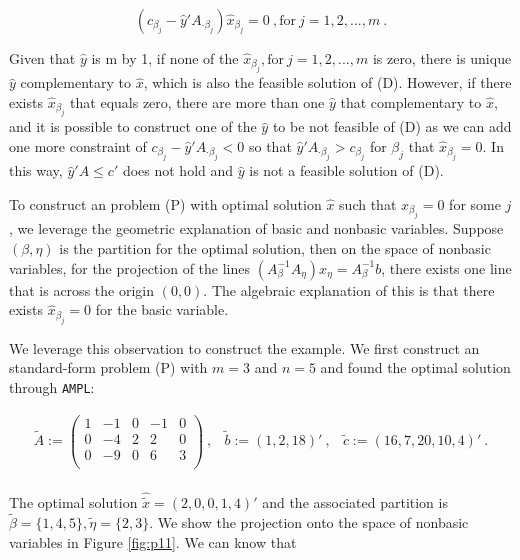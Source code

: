 $$(c_{\beta_j}-\hat{y}'A_{\cdot \beta_j})\hat{x}_{\beta_j} = 0~, \text{for}~j=1,2,...,m~.$$

Given that $\hat{y}$ is m by 1, if none of the $\hat{x}_{\beta_j}, \text{for}~j=1,2,...,m$ is zero, there is unique $\hat{y}$ complementary to $\hat{x}$, which is also the feasible solution of (D). However, if there exists $\hat{x}_{\beta_j}$ that equals zero, there are more than one $\hat{y}$ that complementary to $\hat{x}$, and it is possible to construct one of the $\hat{y}$ to be not feasible of (D) as we can add one more constraint of $c_{\beta_j}-\hat{y}'A_{\cdot \beta_j} < 0$ so that $\hat{y}'A_{\cdot \beta_j} > c_{\beta_j}$ for $\beta_j$ that $\hat{x}_{\beta_j} = 0$. In this way, $\hat{y}'A \leq c'$ does not hold and $\hat{y}$ is not a feasible solution of (D).

To construct an problem (P) with optimal solution $\hat{x}$ such that $\hat{x}_{\beta_j} = 0$ for some $j$, we leverage the geometric explanation of basic and nonbasic variables. Suppose $(\beta, \eta)$ is the partition for the optimal solution, then on the space of nonbasic variables, for the projection of the lines $\left(A_\beta^{-1}A_\eta\right)x_\eta = A_\beta^{-1}b$, there exists one line that is across the origin $(0,0)$. The algebraic explanation of this is that there exists $\hat{x}_{\beta_j} = 0$ for the basic variable.

We leverage this observation to construct the example. We first construct an standard-form problem (P) with $m=3$ and $n=5$ and found the optimal solution through {\tt AMPL}:

\[
\begin{array}{ccc}
\tilde{A}  :=  \left(
  \begin{array}{ccccc}
    1 & -1 & 0 & -1 & 0  \\
    0 & -4 & 2 & 2 & 0 \\
    0 & -9 & 0 & 6 & 3\\
  \end{array}
\right)~, &
\tilde{b}  :=  (1,2,18)'~,&
\tilde{c}  :=  (16, 7, 20, 10, 4)'~.\\

\end{array}
\]

The optimal solution $\hat{\tilde{x}} = (2,0,0,1,4)'$ and the associated partition is $\tilde{\beta} = \{1,4,5\}, \tilde{\eta}= \{2,3\}$. We show the projection onto the space of nonbasic variables in Figure \ref{fig:p11}. We can know that 


